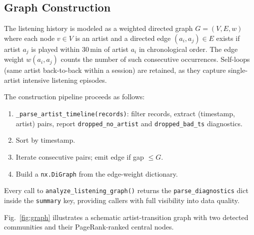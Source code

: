 \documentclass[conference]{IEEEtran}
\begin{document}
\subsection{Graph Construction}

The listening history is modeled as a weighted directed graph
$G = (V, E, w)$ where each node $v \in V$ is an artist and a directed edge
$(a_i, a_j) \in E$ exists if artist $a_j$ is played within 30\,min of artist
$a_i$ in chronological order. The edge weight $w(a_i, a_j)$ counts the number
of such consecutive occurrences. Self-loops (same artist back-to-back within
a session) are retained, as they capture single-artist intensive listening
episodes.

The construction pipeline proceeds as follows:
\begin{enumerate}
  \item \texttt{\_parse\_artist\_timeline(records)}: filter records,
        extract (timestamp, artist) pairs, report
        \texttt{dropped\_no\_artist} and \texttt{dropped\_bad\_ts}
        diagnostics.
  \item Sort by timestamp.
  \item Iterate consecutive pairs; emit edge if gap $\leq G$.
  \item Build a \texttt{nx.DiGraph} from the edge-weight dictionary.
\end{enumerate}
Every call to \texttt{analyze\_listening\_graph()} returns the
\texttt{parse\_diagnostics} dict inside the \texttt{summary} key, providing
callers with full visibility into data quality.

Fig.~\ref{fig:graph} illustrates a schematic artist-transition graph
with two detected communities and their PageRank-ranked central nodes.
\end{document}
